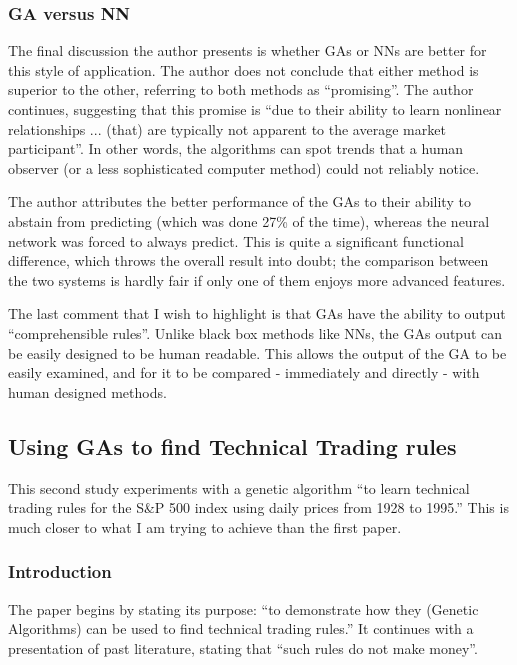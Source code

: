 \subsubsection{GA versus NN}

The final discussion the author presents is whether GAs or NNs are better for this style of application. The author does not conclude that either method is superior to the other, referring to both methods as ``promising''. The author continues, suggesting that this promise is ``due to their ability to learn nonlinear relationships ... (that) are typically not apparent to the average market participant''. In other words, the algorithms can spot trends that a human observer (or a less sophisticated computer method) could not reliably notice. \newline

The author attributes the better performance of the GAs to their ability to abstain from predicting (which was done 27\% of the time), whereas the neural network was forced to always predict. This is quite a significant functional difference, which throws the overall result into doubt; the comparison between the two systems is hardly fair if only one of them enjoys more advanced features. \newline

The last comment that I wish to highlight is that GAs have the ability to output ``comprehensible rules''. Unlike black box methods like NNs, the GAs output can be easily designed to be human readable. This allows the output of the GA to be easily examined, and for it to be compared - immediately and directly - with human designed methods.

\subsection{Using GAs to find Technical Trading rules \cite{allenKarjalainen}}
This second study experiments with a genetic algorithm ``to learn technical trading rules for the S\&P 500 index using daily prices from 1928 to 1995.'' This is much closer to what I am trying to achieve than the first paper.

\subsubsection{Introduction}
The paper begins by stating its purpose: ``to demonstrate how they (Genetic Algorithms) can be used to find technical trading rules.'' It continues with a presentation of past literature, stating that ``such rules do not make money''. \newline

